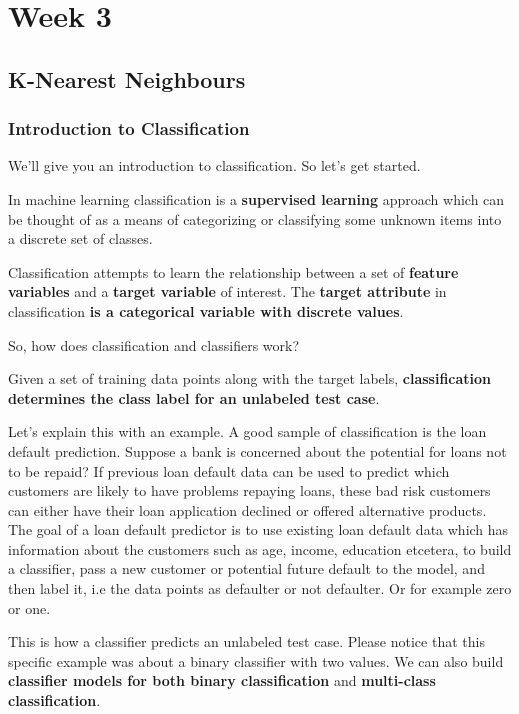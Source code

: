 \chapter{Week 3}

\section{K-Nearest Neighbours}

	\subsection{Introduction to Classification}	
	
	We'll give you an introduction to classification. So let's get started. 
	
	In machine learning classification is a \textbf{supervised learning} approach which can be thought of as a means of categorizing or classifying some unknown items into a discrete set of classes.
	
	Classification attempts to learn the relationship between a set of \textbf{feature variables} and a \textbf{target variable} of interest. The \textbf{target attribute} in classification \textbf{is a categorical variable with discrete values}. 
	
	So, how does classification and classifiers work?
	
	Given a set of training data points along with the target labels, \textbf{classification determines the class label for an unlabeled test case}. 
	
	Let's explain this with an example. A good sample of classification is the loan default prediction. Suppose a bank is concerned about the potential for loans not to be repaid? If previous loan default data can be used to predict which customers are likely to have problems repaying loans, these bad risk customers can either have their loan application declined or offered alternative products. The goal of a loan default predictor is to use existing loan default data which has information about the customers such as age, income, education etcetera, to build a classifier, pass a new customer or potential future default to the model, and then label it, i.e the data points as defaulter or not defaulter. Or for example zero or one. 
	
	This is how a classifier predicts an unlabeled test case. Please notice that this specific example was about a binary classifier with two values. We can also build \textbf{classifier models for both binary classification }and \textbf{multi-class classification}. 
	
